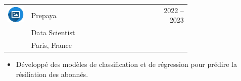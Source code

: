 \documentclass{article}
\begin{document}
\begin{paracol}{2}
\colorbox{maincolor}{%
  \begin{minipage}{\linewidth}
    \begin{tabular}{@{}lp{0.72\linewidth}r}
      \begin{minipage}{0.05\linewidth}
        \includegraphics[width=\linewidth]{picon.png}
      \end{minipage} & 
      Prepaya &  
      {\footnotesize 2022 -- 2023 } \\[-10pt]
      & {\color{sidetext}Data Scientist} & \\
      & {\small Paris, France } & \\
    \end{tabular}
\begin{itemize}
    \item Développé des modèles de classification et de régression pour prédire la résiliation des abonnés.
\end{itemize}
  \end{minipage}%
}

~ \\[-6pt]


\end{paracol}
\end{document}
